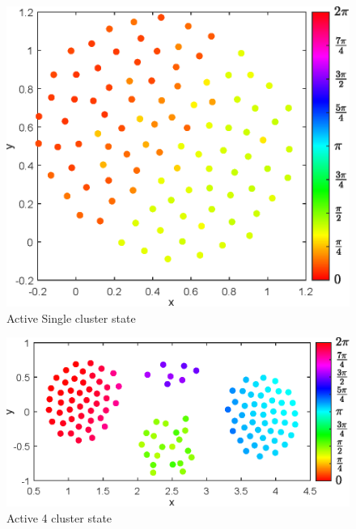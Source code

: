 \documentclass[twocolumn,10pt]{asme2ej}
\begin{document}
{    \begin{figure}[h!]
        \includegraphics[width = \linewidth]{ActiveSingle.eps}
        \caption{Active Single cluster state}
    \end{figure}
    \begin{figure}
        \includegraphics[width = \linewidth]{Active4Clust.eps}
        \caption{Active 4 cluster state}
    \end{figure}
    
}
\end{document}
